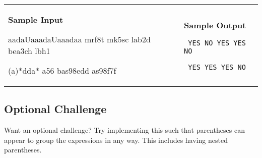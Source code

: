 \documentclass[11pt]{article}
\begin{document}
\vspace{0.25in}\hspace{-0.3in}\begin{tabular}{ll}

\parbox{3in}{{\large\bf Sample Input}

\vspace{0.15in}

{\tt 

aadaUaaadaUaaadaa  \linebreak
mrf8t \linebreak
mk5sc \linebreak
lab2d \linebreak
bea3ch \linebreak
lbh1

}

\vspace{0.15in}

{\tt

(a)*dda*   \linebreak
a56 \linebreak
bas98edd \linebreak
as98f7f

}
}

&

\parbox{3in}{{\large\bf Sample Output}

\vspace{0.15in}

{\tt
YES \linebreak
NO \linebreak
YES \linebreak
YES \linebreak
NO
}

\vspace{0.15in}

{\tt
YES \linebreak
YES \linebreak
YES \linebreak
NO
}
}

\\
\end{tabular}

\subsection*{Optional Challenge}

Want an optional challenge? Try implementing this such that parentheses can appear to group the expressions in any way. This includes having nested parentheses.
\end{document}
